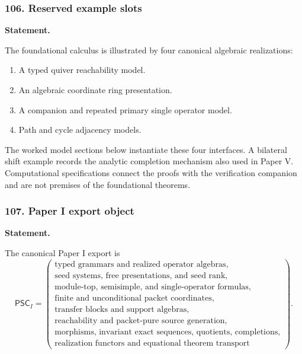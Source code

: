 \subsubsection*{106. Reserved example slots}
\label{rec:PSC-I-ALG-EXAMPLE-SLOTS}
\textbf{Statement.}\par
The foundational calculus is illustrated by four canonical algebraic realizations:
\begin{enumerate}[label=(\roman*)]
\item A typed quiver reachability model.
\item An algebraic coordinate ring presentation.
\item A companion and repeated primary single operator model.
\item Path and cycle adjacency models.
\end{enumerate}
The worked model sections below instantiate these four interfaces. A bilateral shift example records the analytic completion mechanism also used in Paper V. Computational specifications connect the proofs with the verification companion and are not premises of the foundational theorems.
\subsubsection*{107. Paper I export object}
\label{rec:PSC-I-EXPORT}
\textbf{Statement.}\par
The canonical Paper I export is
\[
\boxed{
\mathsf{PSC}_I=
\left(
\begin{array}{c}
\text{typed grammars and realized operator algebras},\\
\text{seed systems, free presentations, and seed rank},\\
\text{module-top, semisimple, and single-operator formulas},\\
\text{finite and unconditional packet coordinates},\\
\text{transfer blocks and support algebras},\\
\text{reachability and packet-pure source generation},\\
\text{morphisms, invariant exact sequences, quotients, completions},\\
\text{realization functors and equational theorem transport}
\end{array}
\right).
}
\]
